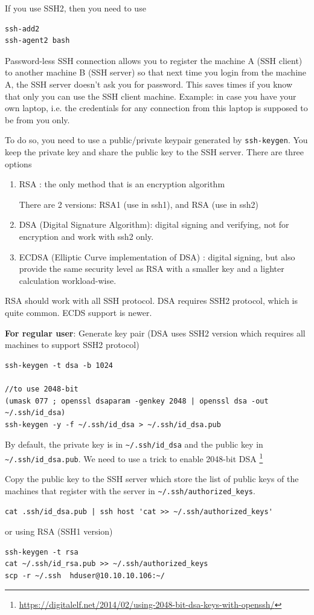 If you use SSH2, then you need to use
\begin{verbatim}
ssh-add2
ssh-agent2 bash
\end{verbatim}



Password-less SSH connection allows you to register the machine A (SSH client)
to another machine B (SSH server) so that next time you login from the machine A,
the SSH server doesn't ask you for password. This saves times if you know that
only you can use the SSH client machine. Example: in case you have your own
laptop, i.e. the credentials for any connection from this laptop is supposed to
be from you only.

To do so, you need to use a public/private keypair generated by
\verb!ssh-keygen!. You keep the private key and share the public key to the SSH
server. There are three options
\begin{enumerate}
  \item RSA : the only method that is an encryption algorithm
  
  There are 2 versions: RSA1 (use in ssh1), and RSA (use in ssh2)
  
  \item DSA (Digital Signature Algorithm): digital signing and verifying, not
  for encryption and work with ssh2 only.
  
  \item ECDSA (Elliptic Curve implementation of DSA) : digital signing, but also
  provide the same security level as RSA with a smaller key and a lighter
  calculation workload-wise. 
\end{enumerate}
RSA should work with all SSH protocol. DSA requires SSH2 protocol, which is
quite common. ECDS support is newer.

{\bf For regular user}: Generate key pair (DSA uses SSH2 version which requires
all machines to support SSH2 protocol)
\begin{verbatim}
ssh-keygen -t dsa -b 1024

//to use 2048-bit
(umask 077 ; openssl dsaparam -genkey 2048 | openssl dsa -out ~/.ssh/id_dsa)
ssh-keygen -y -f ~/.ssh/id_dsa > ~/.ssh/id_dsa.pub
\end{verbatim}
By default, the private key is in \verb!~/.ssh/id_dsa! and the public key in
\verb!~/.ssh/id_dsa.pub!. We need to use a trick to enable 2048-bit DSA
\footnote{\url{https://digitalelf.net/2014/02/using-2048-bit-dsa-keys-with-openssh/}}

Copy the public key to the SSH server which store the list of public keys of the
machines that register with the server in \verb!~/.ssh/authorized_keys!.
\begin{verbatim}
cat .ssh/id_dsa.pub | ssh host 'cat >> ~/.ssh/authorized_keys'
\end{verbatim}
or using RSA (SSH1 version) 
\begin{verbatim}
ssh-keygen -t rsa
cat ~/.ssh/id_rsa.pub >> ~/.ssh/authorized_keys
scp -r ~/.ssh  hduser@10.10.10.106:~/
\end{verbatim}

